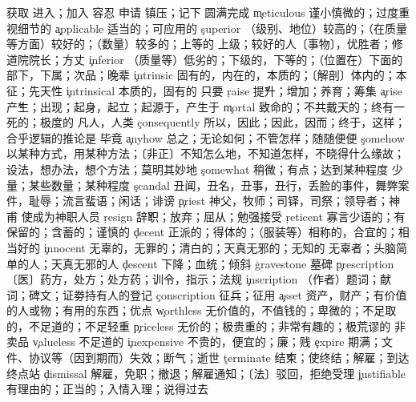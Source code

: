 \begin{multicols}{2}
 获取
 进入；加入
 容忍
 申请
 镇压；记下
 圆满完成
\c{meticulous}  \a 谨小慎微的；过度重视细节的
\c{applicable}  \a 适当的；可应用的
\c{superior}  \a （级别、地位）较高的；（在质量等方面）较好的；（数量）较多的；上等的 \n 上级；较好的人〔事物〕，优胜者；修道院院长；方丈
\c{inferior}  \a （质量等）低劣的；下级的，下等的；（位置在）下面的 \n 部下，下属；次品；晚辈
\c{intrinsic}  \a 固有的，内在的，本质的；〔解剖〕体内的；本征；先天性
\c{intrinsical}  \a 本质的，固有的
 只要
\c{raise}  \v 提升；增加；养育；筹集
\c{arise}  \v 产生；出现；起身，起立；起源于，产生于
\c{mortal}  \a 致命的；不共戴天的；终有一死的；极度的 \n 凡人，人类
\c{consequently}  \ad 所以，因此；因此，因而；终于，这样；合乎逻辑的推论是
 毕竟
\c{anyhow}  \ad 总之；无论如何；不管怎样；随随便便
\c{somehow}  \ad 以某种方式，用某种方法；〔非正〕不知怎么地，不知道怎样，不晓得什么缘故；设法，想办法，想个方法；莫明其妙地
\c{somewhat}  \ad 稍微；有点；达到某种程度 \n 少量；某些数量；某种程度
\c{scandal}  \n 丑闻，丑名，丑事，丑行，丢脸的事件，舞弊案件，耻辱；流言蜚语；闲话；诽谤
\c{priest}  \n 神父，牧师；司铎，司祭；领导者；神甫 \vt 使成为神职人员
\c{resign}  \v 辞职；放弃；屈从；勉强接受
\c{reticent}  \a 寡言少语的；有保留的；含蓄的；谨慎的
\c{decent}  \a 正派的；得体的；（服装等）相称的，合宜的；相当好的
\c{innocent}  \a 无辜的，无罪的；清白的；天真无邪的；无知的 \n 无辜者；头脑简单的人；天真无邪的人
\c{descent}  \n 下降；血统；倾斜
\c{gravestone}  \n 墓碑
\c{prescription}  \n 〔医〕药方，处方；处方药；训令，指示；法规
\c{inscription}  \n （作者）题词；献词；碑文；证劵持有人的登记
\c{conscription}  \n 征兵；征用
\c{asset}  \n 资产，财产；有价值的人或物；有用的东西；优点
\c{worthless}  \a 无价值的，不值钱的；卑微的；不足取的，不足道的；不足轻重
\c{priceless}  \a 无价的；极贵重的；非常有趣的；极荒谬的 \n 非卖品
\c{valueless}  \a 不足道的
\c{inexpensive}  \a 不贵的，便宜的；廉；贱
\c{expire}  \vi 期满；文件、协议等（因到期而）失效；断气；逝世
\c{terminate}  \v 结束；使终结；解雇；到达终点站
\c{dismissal}  \n 解雇，免职；撤退；解雇通知；〔法〕驳回，拒绝受理
\c{justifiable}  \a 有理由的；正当的；入情入理；说得过去

\end{multicols}
